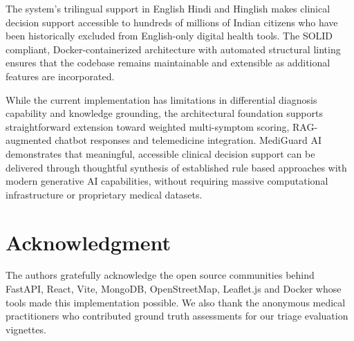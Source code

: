 \documentclass[conference]{IEEEtran}
\begin{document}
The system's trilingual support in English Hindi and Hinglish makes clinical decision support accessible to hundreds of millions of Indian citizens who have been historically excluded from English-only digital health tools. The SOLID compliant, Docker-containerized architecture with automated structural linting ensures that the codebase remains maintainable and extensible as additional features are incorporated.

While the current implementation has limitations in differential diagnosis capability and knowledge grounding, the architectural foundation supports straightforward extension toward weighted multi-symptom scoring, RAG-augmented chatbot responses and telemedicine integration. MediGuard AI demonstrates that meaningful, accessible clinical decision support can be delivered through thoughtful synthesis of established rule based approaches with modern generative AI capabilities, without requiring massive computational infrastructure or proprietary medical datasets.

\section*{Acknowledgment}

The authors gratefully acknowledge the open source communities behind FastAPI, React, Vite, MongoDB, OpenStreetMap, Leaflet.js and Docker whose tools made this implementation possible. We also thank the anonymous medical practitioners who contributed ground truth assessments for our triage evaluation vignettes.
\end{document}
